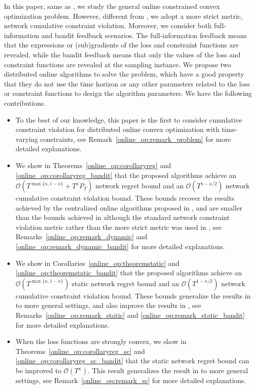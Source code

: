 \documentclass[12pt,draftcls,onecolumn]{IEEEtran}%
\begin{document}
In this paper, same as \cite{sharma2020distributed}, we study the general online constrained convex optimization problem. However, different from \cite{sharma2020distributed}, we adopt a more strict metric, network cumulative constraint violation. Moreover, we consider both full-information and bandit feedback scenarios. The full-information feedback means that the expressions or (sub)gradients of the  loss and constraint functions are revealed, while the bandit feedback means that only the values of the loss and constraint functions are revealed at the sampling instance.
We propose two distributed online algorithms to solve the problem, which have a good property that they do not use the time horizon or any other parameters related to the loss or constraint functions to design the algorithm parameters. We have the following contributions.
\begin{itemize}
	\item To the best of our knowledge, this paper is the first to consider cumulative constraint violation for distributed online convex optimization with time-varying constraints, see Remark~\ref{online_op:remark_problem} for more detailed explanations. 
	\item We show in Theorems~\ref{online_op:corollaryreg} and \ref{online_op:corollaryreg_bandit} that the proposed algorithms achieve an $\mathcal{O}(T^{\max\{\kappa,1-\kappa\}}+T^{\kappa}P_T)$ network regret bound and an $\mathcal{O}(T^{1-\kappa/2})$ network cumulative constraint violation bound. These bounds recover the results achieved by the centralized online algorithms proposed in \cite{zinkevich2003online,yi2016tracking,cao2019online}, and are smaller than the bounds achieved in \cite{sharma2020distributed} although the standard network constraint violation metric rather than the more strict metric was used in \cite{sharma2020distributed}, see Remarks~\ref{online_op:remark_dynamic} and \ref{online_op:remark_dynamic_bandit} for more detailed explanations.
	\item We show in Corollaries~\ref{online_op:theoremstatic} and \ref{online_op:theoremstatic_bandit} that the proposed algorithms achieve an $\mathcal{O}(T^{\max\{\kappa,1-\kappa\}})$ static network regret bound and an $\mathcal{O}(T^{1-\kappa/2})$ network cumulative constraint violation bound. These bounds generalize the results in \cite{agarwal2010optimal,shamir2017optimal,mahdavi2012trading,jenatton2016adaptive,
		NIPS2018_7852,sun2017safety,yuan2017adaptive,yuan2021distributed,yuan2021distributedb} to more general settings,  and also improve the results in \cite{yuan2017adaptive}, see Remarks~\ref{online_op:remark_static} and \ref{online_op:remark_static_bandit} for more detailed explanations.
	\item When the loss functions are strongly convex, we show in Theorems~\ref{online_op:corollaryreg_sc} and \ref{online_op:corollaryreg_sc_bandit} that the static network regret bound can be improved to $\mathcal{O}(T^{\kappa})$. This result generalizes the result in \cite{yuan2017adaptive} to more general settings, see Remark~\ref{online_op:remark_sc} for more detailed explanations. 
\end{itemize}
\end{document}
